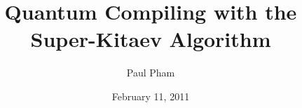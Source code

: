 \documentclass[twocolumn,10pt]{article}
\title{Quantum Compiling with the Super-Kitaev Algorithm}
\date{February 11, 2011}
\author{Paul Pham}
\theoremstyle{plain}
\begin{document}
\newcommand{\braket}[2]{\langle #1|#2 \rangle}
\newcommand{\normtwo}{\frac{1}{\sqrt{2}}}
\newcommand{\norm}[1]{\parallel #1 \parallel}

\maketitle







%





%





















\end{document}
